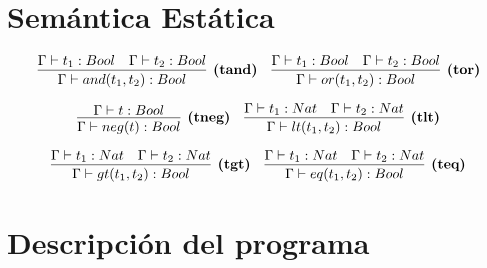 \documentclass{article}
\begin{document}
\\\\ \hspace{1em}
 \\
\\\\ \hspace{1em} \hspace{1em}
 \\
\\\\ \hspace{1em}
 \\
\\\\ \hspace{1em}
 \\

\section{Semántica Estática}
$$
\infer[\textbf{(tand)}]            
{\Gamma \vdash and(t_1,t_2): Bool }
{
	\Gamma \vdash t_1 : Bool \quad \Gamma \vdash t_2 : Bool
}
\quad
\infer[\textbf{(tor)}]
{\Gamma \vdash or(t_1,t_2): Bool }
{
	\Gamma \vdash t_1 : Bool \quad \Gamma \vdash t_2 : Bool
}
$$

$$
\infer[\textbf{(tneg)}]            
{\Gamma \vdash neg(t): Bool }
{
	\Gamma \vdash t : Bool
}
\quad
\infer[\textbf{(tlt)}]
{\Gamma \vdash lt(t_1,t_2): Bool }
{
	\Gamma \vdash t_1 : Nat \quad \Gamma \vdash t_2 : Nat
}
$$

$$
\infer[\textbf{(tgt)}]            
{\Gamma \vdash gt(t_1,t_2): Bool }
{
	\Gamma \vdash t_1 : Nat \quad \Gamma \vdash t_2 : Nat
}
\quad
\infer[\textbf{(teq)}]
{\Gamma \vdash eq(t_1,t_2): Bool }
{
	\Gamma \vdash t_1 : Nat  \quad \Gamma \vdash t_2 : Nat
}
$$
\section{Descripción del programa}
\end{document}
